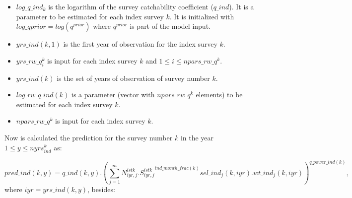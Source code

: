 \documentclass{article}
\begin{document}
\begin{itemize}
    \item $log\_q\_ind_k$ is the logarithm of the survey catchability coefficient ($q\_ind$). It is a parameter to be estimated for each index survey $k$. %
    It is initialized with $log\_qprior=log(q^{prior})$ where $q^{prior}$ is part of the model input.
    
        
    \item $yrs\_ind(k,1)$ is the first year of observation for the index survey $k$.
    
    \item $yrs\_rw\_q^k_i$ is input for each index survey $k$ and $1\leq i \leq npars\_rw\_q^k$. %
    
    \item $yrs\_ind(k)$ is the set of years of observation of survey number $k$. 
    
    \item $log\_rw\_q\_ind(k)$ is a parameter (vector with $npars\_rw\_q^k$ elements) to be estimated for each index survey $k$.

    \item $npars\_rw\_q^k$ is input for each index survey $k$.
\end{itemize}

Now is calculated the prediction for the survey number $k$ in the year $1\leq y \leq nyrs_{ind}^k$ as:


\begin{equation} \label{eq: predind}
    pred\_ind(k,y)=q\_ind(k,y).
    \left(\sum_{j=1}^mN^{istk}_{iyr,j}.{S^{istk}_{iyr,j}}^{ind\_month\_frac(k)}sel\_ind_j(k,iyr).wt\_ind_j(k,iyr)\right)^{q\_power\_ind(k)},
\end{equation}
where $iyr=yrs\_ind(k,y)$, besides:
\end{document}
